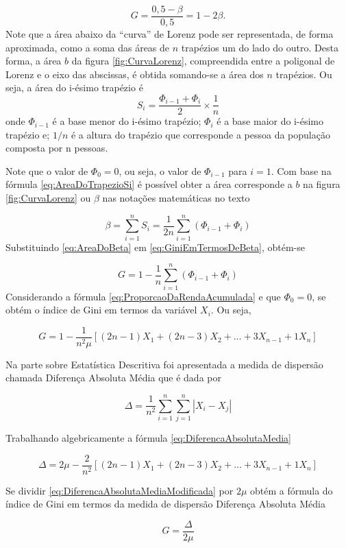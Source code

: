 \documentclass[
]{book}
\begin{document}
\[
G = \dfrac{0,5 - \beta}{0,5} = 1 - 2\beta.
\label{eq:GiniEmTermosDeBeta}
\]
Note que a área abaixo da ``curva'' de Lorenz pode ser representada, de forma aproximada, como a soma das áreas de \(n\) trapézios um do lado do outro. Desta forma, a área \(b\) da figura \ref{fig:CurvaLorenz}, compreendida entre a poligonal de Lorenz e o eixo das abscissas, é obtida somando-se a área dos \(n\) trapézios. Ou seja, a área do i-ésimo trapézio é
\[
S_i = \dfrac{\Phi_{i-1} + \Phi_i}{2}\times \dfrac{1}{n}
\label{eq:AreaDoTrapezioSi}
\]
onde \(\Phi_{i-1}\) é a base menor do i-ésimo trapézio; \(\Phi_i\) é a base maior do i-ésimo trapézio e; \(1/n\) é a altura do trapézio que corresponde a pessoa da população composta por n pessoas.

Note que o valor de \(\Phi_0 = 0\), ou seja, o valor de \(\Phi_{i-1}\) para \(i=1\). Com base na fórmula \eqref{eq:AreaDoTrapezioSi} é possível obter a área corresponde a \(b\) na figura \ref{fig:CurvaLorenz} ou \(\beta\) nas notações matemáticas no texto

\[
\beta = \sum_{i=1}^{n}S_i = \dfrac{1}{2n}\sum_{i=1}^{n}(\Phi_{i-1} + \Phi_i)
\label{eq:AreaDoBeta}
\]
Substituindo \eqref{eq:AreaDoBeta} em \eqref{eq:GiniEmTermosDeBeta}, obtém-se

\[
G = 1 - \dfrac{1}{n}\sum_{i=1}^{n}(\Phi_{i-1} + \Phi_i)
\label{eq:GiniEmTermosDePhi}
\]
Considerando a fórmula \eqref{eq:ProporcaoDaRendaAcumulada} e que \(\Phi_0 = 0\), se obtém o índice de Gini em termos da variável \(X_i\). Ou seja,

\[
G = 1 - \dfrac{1}{n^2\mu}[(2n-1)X_1 + (2n-3)X_2 + \dots + 3X_{n-1} + 1X_n]
\label{eq:GiniEmTermosDeXi}
\]

Na parte sobre Estatística Descritiva foi apresentada a medida de dispersão chamada Diferença Absoluta Média que é dada por

\[
\Delta = \dfrac{1}{n^2}\sum_{i=1}^{n}\sum_{j=1}^{n}|X_i - X_j|
\label{eq:DiferencaAbsolutaMedia}
\]

Trabalhando algebricamente a fórmula \eqref{eq:DiferencaAbsolutaMedia}

\[
\Delta = 2\mu - \dfrac{2}{n^2}[(2n-1)X_1 + (2n-3)X_2 + \dots + 3X_{n-1} + 1X_n]
\label{eq:DiferencaAbsolutaMediaModificada}
\]

Se dividir \eqref{eq:DiferencaAbsolutaMediaModificada} por \(2\mu\) obtém a fórmula do índice de Gini em termos da medida de dispersão Diferença Absoluta Média

\[
G = \dfrac{\Delta}{2\mu}
\label{eq:GiniEmTermosDeDiferencaAbsolutaMedia}
\]
\end{document}
